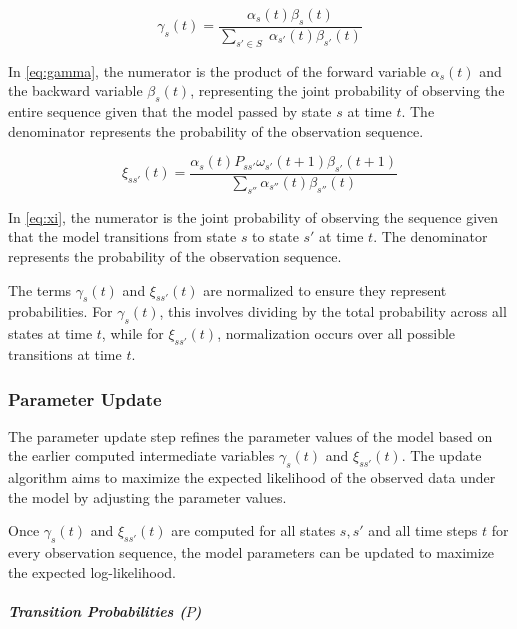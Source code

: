 \begin{equation}
    \gamma_s(t) = \frac{\alpha_s(t) \beta_s(t)}{\sum_{s' \in S} \;\alpha_{s'}(t) \beta_{s'}(t)}
    \label{eq:gamma}
\end{equation}

In \autoref{eq:gamma}, the numerator is the product of the forward variable $\alpha_s(t)$ and the backward variable $\beta_s(t)$, representing the joint probability of observing the entire sequence given that the model passed by state $s$ at time $t$.
The denominator represents the probability of the observation sequence.

\begin{equation}
    \xi_{ss'}(t) = \frac{\alpha_s(t) P_{ss'} \omega_{s'}(t + 1) \beta_{s'}(t + 1)}
    {\sum_{s''}\alpha_{s''}(t) \beta_{s''}(t)}
    \label{eq:xi}
\end{equation}


In \autoref{eq:xi}, the numerator is the joint probability of observing the sequence given that the model transitions from state $s$ to state $s'$ at time $t$.
The denominator represents the probability of the observation sequence.

The terms $\gamma_s(t)$ and $\xi_{ss'}(t)$ are normalized to ensure they represent probabilities.
For $\gamma_s(t)$, this involves dividing by the total probability across all states at time $t$, while for $\xi_{ss'}(t)$, normalization occurs over all possible transitions at time $t$.

\subsubsection{Parameter Update}
The parameter update step refines the parameter values of the model based on the earlier computed intermediate variables $\gamma_s(t)$ and $\xi_{ss'}(t)$.
The update algorithm aims to maximize the expected likelihood of the observed data under the model by adjusting the parameter values.

Once $\gamma_s(t)$ and $\xi_{ss'}(t)$ are computed for all states $s, s'$ and all time steps $t$ for every observation sequence, the model parameters can be updated to maximize the expected log-likelihood.

\paragraph*{\textit{Transition Probabilities ($P$)}}

